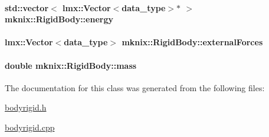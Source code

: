 \hypertarget{classmknix_1_1_rigid_body_a372052707d7e00a97db50ce6d323cdf3}{
\paragraph[{energy}]{\setlength{\rightskip}{0pt plus 5cm}std\-::vector$<$ lmx\-::\-Vector$<${\bf data\-\_\-type}$>$$\ast$ $>$ mknix\-::\-Rigid\-Body\-::energy\hspace{0.3cm}{\ttfamily [protected]}}}\label{classmknix_1_1_rigid_body_a372052707d7e00a97db50ce6d323cdf3}
\hypertarget{classmknix_1_1_rigid_body_ab465103ed21d529c66733705ad5b588c}{
\paragraph[{external\-Forces}]{\setlength{\rightskip}{0pt plus 5cm}lmx\-::\-Vector$<${\bf data\-\_\-type}$>$ mknix\-::\-Rigid\-Body\-::external\-Forces\hspace{0.3cm}{\ttfamily [protected]}}}\label{classmknix_1_1_rigid_body_ab465103ed21d529c66733705ad5b588c}
\hypertarget{classmknix_1_1_rigid_body_af9643b668fbafd10ffd392b8aebdae5e}{
\paragraph[{mass}]{\setlength{\rightskip}{0pt plus 5cm}double mknix\-::\-Rigid\-Body\-::mass\hspace{0.3cm}{\ttfamily [protected]}}}\label{classmknix_1_1_rigid_body_af9643b668fbafd10ffd392b8aebdae5e}


The documentation for this class was generated from the following files\-:\begin{DoxyCompactItemize}
\item 
\hyperlink{bodyrigid_8h}{bodyrigid.\-h}\item 
\hyperlink{bodyrigid_8cpp}{bodyrigid.\-cpp}\end{DoxyCompactItemize}
